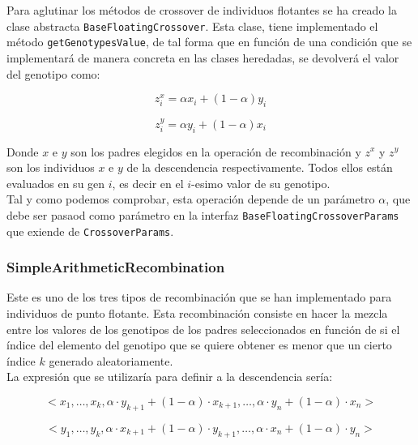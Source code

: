 Para aglutinar los métodos de crossover de individuos flotantes se ha creado la clase abstracta \texttt{BaseFloatingCrossover}. Esta clase, tiene implementado el método \texttt{getGenotypesValue}, de tal forma que en función de una condición que se implementará de manera concreta en las clases heredadas, se devolverá el valor del genotipo como: 

\begin{equation}
    z^x_i = \alpha x_i + (1 - \alpha)y_i
\end{equation}

\begin{equation}
    z^y_i = \alpha y_i + (1 - \alpha)x_i
\end{equation}

Donde $x$ e $y$ son los padres elegidos en la operación de recombinación y $z^x$ y $z^y$ son los individuos $x$ e $y$ de la descendencia respectivamente. Todos ellos están evaluados en su gen $i$, es decir en el $i$-esimo valor de su genotipo. \\

Tal y como podemos comprobar, esta operación depende de un parámetro $\alpha$, que debe ser pasaod como parámetro en la interfaz \texttt{BaseFloatingCrossoverParams} que exiende de \texttt{CrossoverParams}.

\subsubsection{SimpleArithmeticRecombination}

Este es uno de los tres tipos de recombinación que se han implementado para individuos de punto flotante. Esta recombinación consiste en hacer la mezcla entre los valores de los genotipos de los padres seleccionados en función de si el índice del elemento del genotipo que se quiere obtener es menor que un cierto índice $k$ generado aleatoriamente. \\

La expresión que se utilizaría para definir a la descendencia sería:

\begin{equation}
    <x_1, \dots, x_k, \alpha \cdot y_{k+1} + (1 - \alpha) \cdot x_{k+1}, \dots, \alpha \cdot y_n + (1 - \alpha) \cdot x_n >
\end{equation}

\begin{equation}
    <y_1, \dots, y_k, \alpha \cdot x_{k+1} + (1 - \alpha) \cdot y_{k+1}, \dots, \alpha \cdot x_n + (1 - \alpha) \cdot y_n >
\end{equation}

